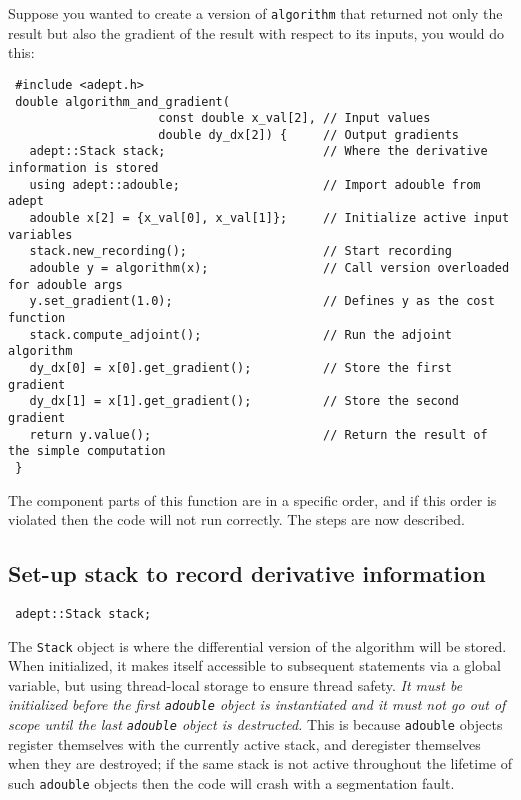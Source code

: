 \documentclass[a4,oneside]{book}
\def\codesize{\small}
\def\code#1{{\codesize\texttt{#1}}}
\begin{document}
Suppose you wanted to create a version of \code{algorithm} that
returned not only the result but also the gradient of the result with
respect to its inputs, you would do this:

\begin{lstlisting}
 #include <adept.h>
 double algorithm_and_gradient(
                     const double x_val[2], // Input values
                     double dy_dx[2]) {     // Output gradients
   adept::Stack stack;                      // Where the derivative information is stored
   using adept::adouble;                    // Import adouble from adept
   adouble x[2] = {x_val[0], x_val[1]};     // Initialize active input variables
   stack.new_recording();                   // Start recording
   adouble y = algorithm(x);                // Call version overloaded for adouble args
   y.set_gradient(1.0);                     // Defines y as the cost function 
   stack.compute_adjoint();                 // Run the adjoint algorithm
   dy_dx[0] = x[0].get_gradient();          // Store the first gradient
   dy_dx[1] = x[1].get_gradient();          // Store the second gradient
   return y.value();                        // Return the result of the simple computation
 }
\end{lstlisting}
%
The component parts of this function are in a specific order, and if
this order is violated then the code will not run correctly. The steps
are now described.
%
\subsection{Set-up stack to record derivative information}
\label{sec:stack_setup}
\begin{lstlisting}
 adept::Stack stack;
\end{lstlisting}
The \code{Stack} object is where the differential version of the
algorithm will be stored. When initialized, it makes itself accessible
to subsequent statements via a global variable, but using thread-local
storage to ensure thread safety. \emph{It must be initialized before
  the first \code{adouble} object is instantiated and it must not go
  out of scope until the last \code{adouble} object is destructed.}
This is because \code{adouble} objects register themselves with the
currently active stack, and deregister themselves when they are
destroyed; if the same stack is not active throughout the lifetime of
such \code{adouble} objects then the code will crash with a
segmentation fault.
\end{document}

